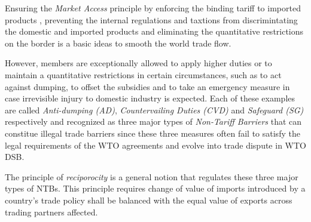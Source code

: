 Ensuring the \textit{Market Access} principle 
by enforcing
the binding tariff to imported products
, preventing the internal regulations 
and taxtions from discrimintating the domestic and imported products
and eliminating the quantitative restrictions on the border 
is a basic ideas to smooth the world trade flow. 

However, members are exceptionally allowed to apply higher duties or to maintain a quantitative restrictions in certain circumstances, such as 
to act against dumping, to offset the subsidies 
and to take an emergency measure in case irrevisible injury to domestic industry is expected. Each of these examples 
are called \textit{Anti-dumping (AD)}, \textit{Countervailing Duties (CVD)} and \textit{Safeguard (SG)} respectively and recognized as 
three major types of \textit{Non-Tariff Barriers} that can constitue illegal trade barriers 
since these three measures often fail to satisfy the legal requirements of the WTO agreements and evolve into trade dispute in WTO DSB.

The principle of \textit{reciporocity} is a general notion that regulates these three major types of NTBs.
This principle requires change of value of imports introduced by a country's trade policy 
shall be balanced with the equal value of exports across trading partners affected. \citep{bagwell1999}





